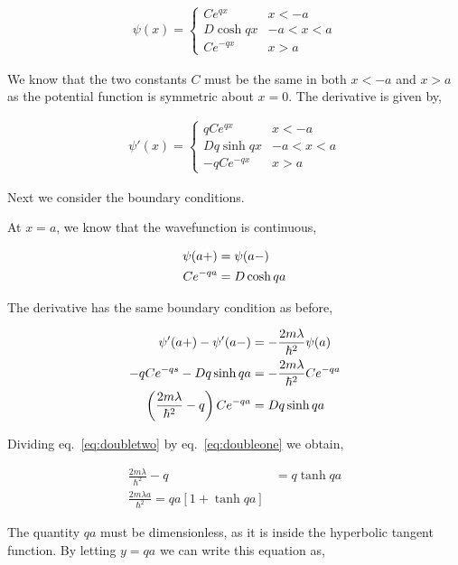 \documentclass[11pt]{amsart}
\begin{document}
\begin{align*}
  \psi(x) =
  \begin{cases}
    Ce^{qx} & x < -a \\
    D\cosh{qx} & -a < x < a \\
    Ce^{-qx} & x > a
  \end{cases}
\end{align*}

We know that the two constants $C$ must be the same in both $x < -a$ and $x > a$ as the potential function is symmetric about $x = 0$. The derivative is given by,

\begin{align*}
  \psi'(x) =
  \begin{cases}
    qCe^{qx} & x < -a \\
    Dq\sinh{qx} & -a < x < a \\
    -qCe^{-qx} & x > a
  \end{cases}
\end{align*}

Next we consider the boundary conditions.

At $x = a$, we know that the wavefunction is continuous,

\begin{align}
  \label{eq:doubleone}
  \psi(a+) &= \psi(a-) \notag\\
  Ce^{-qa} &= D\cosh{qa}
\end{align}

The derivative has the same boundary condition as before,

\begin{align}
  \label{eq:doubletwo}
  \psi'(a+) - \psi'(a-) &= -\frac{2m\lambda}{\hbar^2}\psi(a) \notag\\
  -qCe^{-qs} - Dq\sinh{qa} &= -\frac{2m\lambda}{\hbar^2}Ce^{-qa} \notag\\
  \left(\frac{2m\lambda}{\hbar^2} - q\right)Ce^{-qa} &= Dq\sinh{qa}
\end{align}

Dividing eq.~\ref{eq:doubletwo} by eq.~\ref{eq:doubleone} we obtain,

\begin{align*}
  \frac{2m\lambda}{\hbar^2} - q &= q\tanh{qa} \\
  \frac{2m\lambda a}{\hbar^2} = qa\left[1 + \tanh{qa}\right]
\end{align*}

The quantity $qa$ must be dimensionless, as it is inside the hyperbolic tangent function. By letting $y = qa$ we can write this equation as,
\end{document}
